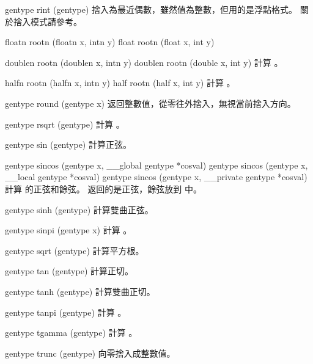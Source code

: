 gentype rint (gentype)
\stopbuffer
{}
捨入為最近偶數，雖然值為整數，但用的是浮點格式。
關於捨入模式請參考。
\stopbuffer

floatn rootn (floatn x, intn y)
float rootn (float x, int y)

doublen rootn (doublen x, intn y)
doublen rootn (double x, int y)
\stopbuffer
{}
計算 。
\stopbuffer

halfn rootn (halfn x, intn y)
half rootn (half x, int y)
\stopbuffer
{}
計算 。
\stopbuffer

gentype round (gentype x)
\stopbuffer
{}
返回整數值，從零往外捨入，無視當前捨入方向。
\stopbuffer

gentype rsqrt (gentype)
\stopbuffer
{}
計算 。
\stopbuffer

gentype sin (gentype)
\stopbuffer
{}
計算正弦。
\stopbuffer

gentype sincos (gentype x,
	__global gentype *cosval)
gentype sincos (gentype x,
	__local gentype *cosval)
gentype sincos (gentype x,
	__private gentype *cosval)
\stopbuffer
{}
計算  的正弦和餘弦。
返回的是正弦，餘弦放到  中。
\stopbuffer

gentype sinh (gentype)
\stopbuffer
{}
計算雙曲正弦。
\stopbuffer

gentype sinpi (gentype x)
\stopbuffer
{}
計算 。
\stopbuffer

gentype sqrt (gentype)
\stopbuffer
{}
計算平方根。
\stopbuffer

gentype tan (gentype)
\stopbuffer
{}
計算正切。
\stopbuffer

gentype tanh (gentype)
\stopbuffer
{}
計算雙曲正切。
\stopbuffer

gentype tanpi (gentype)
\stopbuffer
{}
計算 。
\stopbuffer

gentype tgamma (gentype)
\stopbuffer
{}
計算 。
\stopbuffer

gentype trunc (gentype)
\stopbuffer
{}
向零捨入成整數值。
\stopbuffer
